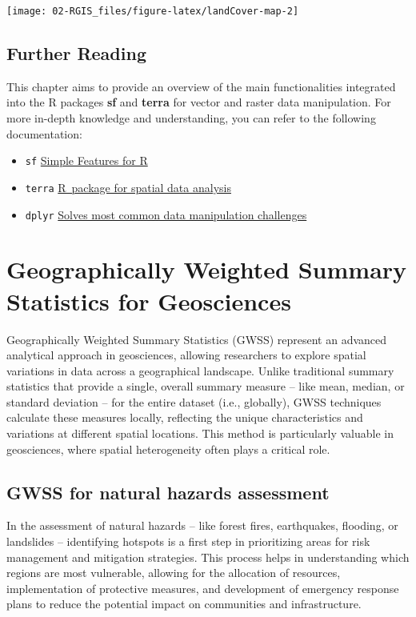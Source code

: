 \documentclass[
]{article}
\begin{document}
\begin{center}\texttt{[image: 02-RGIS\_files/figure-latex/landCover-map-2]} \end{center}

\subsection{Further Reading}\label{further-reading}

This chapter aims to provide an overview of the main functionalities integrated into the R packages \textbf{sf} and \textbf{terra} for vector and raster data manipulation. For more in-depth knowledge and understanding, you can refer to the following documentation:

\begin{itemize}
\item
  \texttt{sf} \href{https://r-spatial.github.io/sf/index.html}{Simple Features for R}
\item
  \texttt{terra} \href{https://rspatial.github.io/terra/index.html}{R~package for spatial data analysis}
\item
  \texttt{dplyr} \href{https://dplyr.tidyverse.org/index.html}{Solves most common data manipulation challenges}
\end{itemize}

\section{Geographically Weighted Summary Statistics for Geosciences}\label{gwss}

Geographically Weighted Summary Statistics (GWSS) represent an advanced analytical approach in geosciences, allowing researchers to explore spatial variations in data across a geographical landscape. Unlike traditional summary statistics that provide a single, overall summary measure -- like mean, median, or standard deviation -- for the entire dataset (i.e., globally), GWSS techniques calculate these measures locally, reflecting the unique characteristics and variations at different spatial locations. This method is particularly valuable in geosciences, where spatial heterogeneity often plays a critical role.

\subsection{GWSS for natural hazards assessment}\label{gwss-for-natural-hazards-assessment}

In the assessment of natural hazards -- like forest fires, earthquakes, flooding, or landslides -- identifying hotspots is a first step in prioritizing areas for risk management and mitigation strategies. This process helps in understanding which regions are most vulnerable, allowing for the allocation of resources, implementation of protective measures, and development of emergency response plans to reduce the potential impact on communities and infrastructure.
\end{document}
